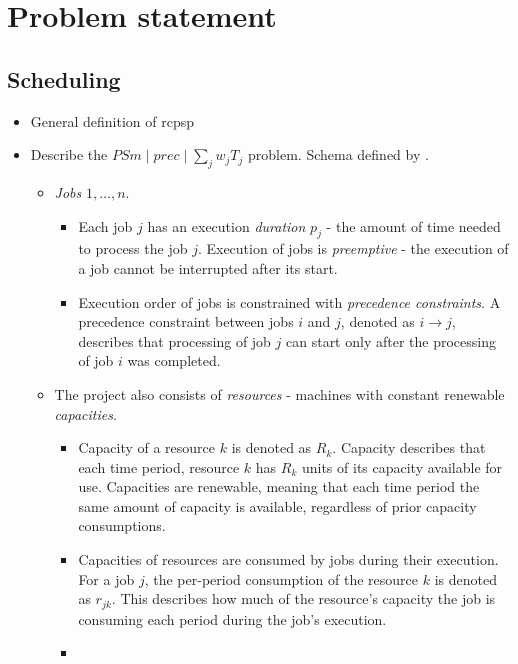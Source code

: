 \chapter{Problem statement}

\section{Scheduling}

\begin{itemize}
    \item General definition of \ac{rcpsp}

    \item Describe the $PSm \;|\; prec \;|\; \sum_{j} w_j T_j$ problem.
        Schema defined by \citet{BRUCKER1999}.
    \begin{itemize}
        \item \emph{Jobs} $1, \dots, n$.
        \begin{itemize}
            \item Each job $j$ has an execution \emph{duration} $p_j$ - the amount of time needed to process
                the job $j$. Execution of jobs is \emph{preemptive} - the execution of a job cannot be interrupted
                after its start.
            \item Execution order of jobs is constrained with \emph{precedence constraints}.
                A precedence constraint between jobs $i$ and $j$, denoted as $i \rightarrow j$,
                describes that processing of job $j$ can start only after the processing of job $i$
                was completed.
        \end{itemize}
        
        \item The project also consists of \emph{resources} - machines with constant renewable \emph{capacities}.
        \begin{itemize}
            \item Capacity of a resource $k$ is denoted as $R_k$. Capacity describes that each time period,
                resource $k$ has $R_k$ units of its capacity available for use. Capacities are renewable,
                meaning that each time period the same amount of capacity is available, regardless of prior
                capacity consumptions.
            \item Capacities of resources are consumed by jobs during their execution. For a job $j$,
                the per-period consumption of the resource $k$ is denoted as $r_{jk}$. This describes how much
                of the resource's capacity the job is consuming each period during the job's execution.
            \item {}
        \end{itemize}


\end{itemize}
\end{itemize}

